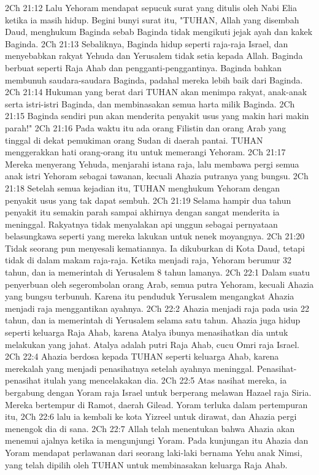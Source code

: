 2Ch 21:12  Lalu Yehoram mendapat sepucuk surat yang ditulis oleh Nabi Elia ketika ia masih hidup. Begini bunyi surat itu, "TUHAN, Allah yang disembah Daud, menghukum Baginda sebab Baginda tidak mengikuti jejak ayah dan kakek Baginda.
2Ch 21:13  Sebaliknya, Baginda hidup seperti raja-raja Israel, dan menyebabkan rakyat Yehuda dan Yerusalem tidak setia kepada Allah. Baginda berbuat seperti Raja Ahab dan pengganti-penggantinya. Baginda bahkan membunuh saudara-saudara Baginda, padahal mereka lebih baik dari Baginda.
2Ch 21:14  Hukuman yang berat dari TUHAN akan menimpa rakyat, anak-anak serta istri-istri Baginda, dan membinasakan semua harta milik Baginda.
2Ch 21:15  Baginda sendiri pun akan menderita penyakit usus yang makin hari makin parah!"
2Ch 21:16  Pada waktu itu ada orang Filistin dan orang Arab yang tinggal di dekat pemukiman orang Sudan di daerah pantai. TUHAN menggerakkan hati orang-orang itu untuk memerangi Yehoram.
2Ch 21:17  Mereka menyerang Yehuda, menjarahi istana raja, lalu membawa pergi semua anak istri Yehoram sebagai tawanan, kecuali Ahazia putranya yang bungsu.
2Ch 21:18  Setelah semua kejadian itu, TUHAN menghukum Yehoram dengan penyakit usus yang tak dapat sembuh.
2Ch 21:19  Selama hampir dua tahun penyakit itu semakin parah sampai akhirnya dengan sangat menderita ia meninggal. Rakyatnya tidak menyalakan api unggun sebagai pernyataan belasungkawa seperti yang mereka lakukan untuk nenek moyangnya.
2Ch 21:20  Tidak seorang pun menyesali kematiannya. Ia dikuburkan di Kota Daud, tetapi tidak di dalam makam raja-raja. Ketika menjadi raja, Yehoram berumur 32 tahun, dan ia memerintah di Yerusalem 8 tahun lamanya.
2Ch 22:1  Dalam suatu penyerbuan oleh segerombolan orang Arab, semua putra Yehoram, kecuali Ahazia yang bungsu terbunuh. Karena itu penduduk Yerusalem mengangkat Ahazia menjadi raja menggantikan ayahnya.
2Ch 22:2  Ahazia menjadi raja pada usia 22 tahun, dan ia memerintah di Yerusalem selama satu tahun. Ahazia juga hidup seperti keluarga Raja Ahab, karena Atalya ibunya menasihatkan dia untuk melakukan yang jahat. Atalya adalah putri Raja Ahab, cucu Omri raja Israel.
2Ch 22:4  Ahazia berdosa kepada TUHAN seperti keluarga Ahab, karena merekalah yang menjadi penasihatnya setelah ayahnya meninggal. Penasihat-penasihat itulah yang mencelakakan dia.
2Ch 22:5  Atas nasihat mereka, ia bergabung dengan Yoram raja Israel untuk berperang melawan Hazael raja Siria. Mereka bertempur di Ramot, daerah Gilead. Yoram terluka dalam pertempuran itu,
2Ch 22:6  lalu ia kembali ke kota Yizreel untuk dirawat, dan Ahazia pergi menengok dia di sana.
2Ch 22:7  Allah telah menentukan bahwa Ahazia akan menemui ajalnya ketika ia mengunjungi Yoram. Pada kunjungan itu Ahazia dan Yoram mendapat perlawanan dari seorang laki-laki bernama Yehu anak Nimsi, yang telah dipilih oleh TUHAN untuk membinasakan keluarga Raja Ahab.
